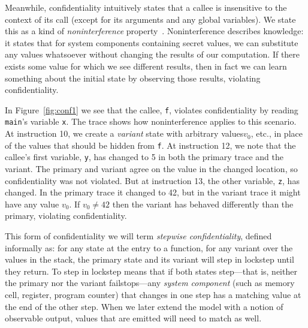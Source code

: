 \documentclass[acmsmall,review,anonymous]{acmart}\settopmatter{printfolios=true,printccs=false,printacmref=false}
\begin{document}
Meanwhile, confidentiality intuitively states that a callee is insensitive to
the context of its call (except for its arguments and any global
variables).
We state this as a kind of {\em noninterference} property~\citep{??}.
Noninterference describes knowledge: it states that for system components
containing secret values, we can substitute any values whatsoever without changing the results
of our computation. If there exists some value for which we see different results, then
in fact we can learn something about the initial state by observing those results, violating
confidentiality.

In Figure~\ref{fig:conf1} we see that the callee, {\tt f}, violates confidentiality
by reading {\tt main}'s variable {\tt x}. The trace
shows how noninterference applies to this scenario. At instruction 10, we create a {\em variant}
state with arbitrary values\ifaftersubmission{}\fi \(v_0\), etc., in place of the values that should
be hidden from {\tt f}. At instruction 12, we note that the callee's first variable, {\tt y}, has
changed to 5 in both the primary trace and the variant. The primary and variant agree on
the value in the changed location, so confidentiality was not violated. But at instruction 13,
the other variable, {\tt z}, has changed. In the primary trace it changed to 42, but
in the variant trace it might have any value \(v_0\). If \(v_0 \neq 42\) then the variant
has behaved differently than the primary, violating confidentiality.

This form of confidentiality we will term {\em stepwise confidentiality}, defined informally
as: for any state at the entry to a function, for any variant over the values in the stack,
the primary state and its variant will step in lockstep until they return. To step in lockstep
means that if both states step---that is, neither the primary nor the variant failstops---any
{\em system component} (such as memory cell, register, program counter) that changes
in one step has a matching value at the end of the other step. When we later
extend the model with a notion of observable output, values that are emitted will need
to match as well.

\end{document}
